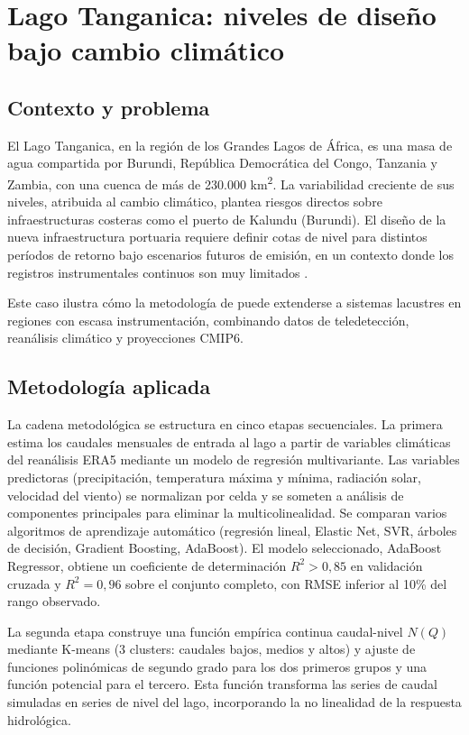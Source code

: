\clearpage
\section{Lago Tanganica: niveles de diseño bajo cambio climático}
\label{sec:caso_tanganika}

\subsection{Contexto y problema}

El Lago Tanganica, en la región de los Grandes Lagos de África, es una masa de agua compartida por Burundi, República Democrática del Congo, Tanzania y Zambia, con una cuenca de más de 230.000 km\textsuperscript{2}. La variabilidad creciente de sus niveles, atribuida al cambio climático, plantea riesgos directos sobre infraestructuras costeras como el puerto de Kalundu (Burundi). El diseño de la nueva infraestructura portuaria requiere definir cotas de nivel para distintos períodos de retorno bajo escenarios futuros de emisión, en un contexto donde los registros instrumentales continuos son muy limitados \parencite{navas2025tanganika}.

Este caso ilustra cómo la metodología de \hydra puede extenderse a sistemas lacustres en regiones con escasa instrumentación, combinando datos de teledetección, reanálisis climático y proyecciones CMIP6.

\subsection{Metodología aplicada}

La cadena metodológica se estructura en cinco etapas secuenciales. La primera estima los caudales mensuales de entrada al lago a partir de variables climáticas del reanálisis ERA5 \parencite{hersbach2020era5} mediante un modelo de regresión multivariante. Las variables predictoras (precipitación, temperatura máxima y mínima, radiación solar, velocidad del viento) se normalizan por celda y se someten a análisis de componentes principales para eliminar la multicolinealidad. Se comparan varios algoritmos de aprendizaje automático (regresión lineal, Elastic Net, SVR, árboles de decisión, Gradient Boosting, AdaBoost). El modelo seleccionado, AdaBoost Regressor, obtiene un coeficiente de determinación $R^2 > 0{,}85$ en validación cruzada y $R^2 = 0{,}96$ sobre el conjunto completo, con RMSE inferior al 10\% del rango observado.

La segunda etapa construye una función empírica continua caudal-nivel $N(Q)$ mediante K-means (3 clusters: caudales bajos, medios y altos) y ajuste de funciones polinómicas de segundo grado para los dos primeros grupos y una función potencial para el tercero. Esta función transforma las series de caudal simuladas en series de nivel del lago, incorporando la no linealidad de la respuesta hidrológica.

